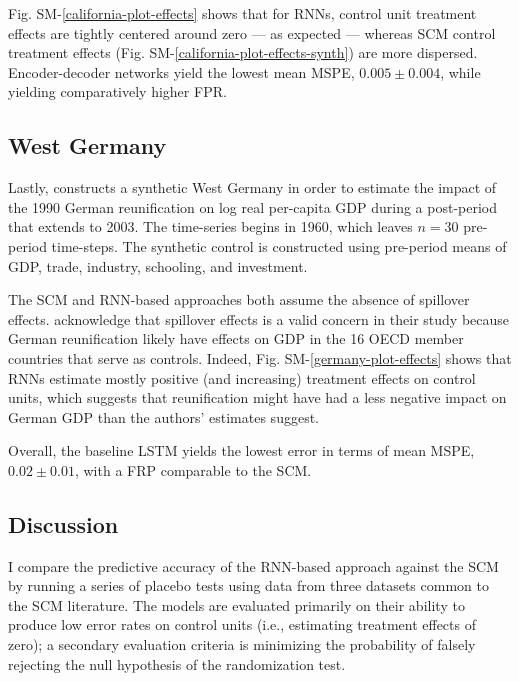 \documentclass[hidelinks,12pt]{article}
\begin{document}
Fig. SM-\ref{california-plot-effects} shows that for RNNs, control unit treatment effects are tightly centered around zero --- as expected --- whereas SCM control treatment effects (Fig. SM-\ref{california-plot-effects-synth}) are more dispersed. Encoder-decoder networks yield the lowest mean MSPE, $0.005 \pm 0.004$, while yielding comparatively higher FPR.  

\subsection{West Germany} 

Lastly, \citet{abadie2015comparative} constructs a synthetic West Germany in order to estimate the impact of the 1990 German reunification on log real per-capita GDP during a post-period that extends to 2003. The time-series begins in 1960, which leaves $n=30$ pre-period time-steps. The synthetic control is constructed using pre-period means of GDP, trade, industry, schooling, and investment. 

The SCM and RNN-based approaches both assume the absence of spillover effects. \citet{abadie2015comparative} acknowledge that spillover effects is a valid concern in their study because German reunification likely have effects on GDP in the 16 OECD member countries that serve as controls. Indeed, Fig. SM-\ref{germany-plot-effects} shows that RNNs estimate mostly positive (and increasing) treatment effects on control units, which suggests that reunification might have had a less negative impact on German GDP than the authors' estimates suggest.

Overall, the baseline LSTM yields the lowest error in terms of mean MSPE, $0.02 \pm 0.01$, with a FRP comparable to the SCM.

\subsection{Discussion}

I compare the predictive accuracy of the RNN-based approach against the SCM by running a series of placebo tests using data from three datasets common to the SCM literature. The models are evaluated primarily on their ability to produce low error rates on control units (i.e., estimating treatment effects of zero); a secondary evaluation criteria is minimizing the probability of falsely rejecting the null hypothesis of the randomization test. 
\end{document}
